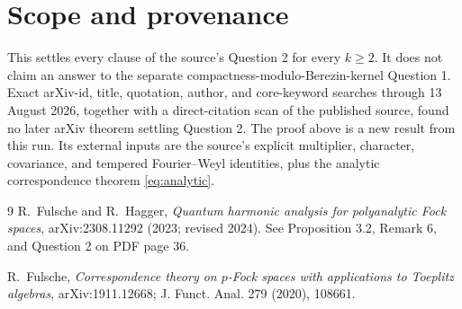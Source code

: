 \documentclass[10pt]{article}
\begin{document}
\section*{Scope and provenance}

This settles every clause of the source's Question 2 for every \(k\geq2\). It does not claim an answer to the separate compactness-modulo-Berezin-kernel Question 1. Exact arXiv-id, title, quotation, author, and core-keyword searches through 13 August 2026, together with a direct-citation scan of the published source, found no later arXiv theorem settling Question 2. The proof above is a new result from this run. Its external inputs are the source's explicit multiplier, character, covariance, and tempered Fourier--Weyl identities, plus the analytic correspondence theorem \eqref{eq:analytic}.

\begin{thebibliography}{9}
R.~Fulsche and R.~Hagger,
\emph{Quantum harmonic analysis for polyanalytic Fock spaces},
arXiv:2308.11292 (2023; revised 2024).
See Proposition 3.2, Remark 6, and Question 2 on PDF page 36.

R.~Fulsche,
\emph{Correspondence theory on \(p\)-Fock spaces with applications to Toeplitz algebras},
arXiv:1911.12668; J. Funct. Anal. 279 (2020), 108661.
\end{thebibliography}
\end{document}
